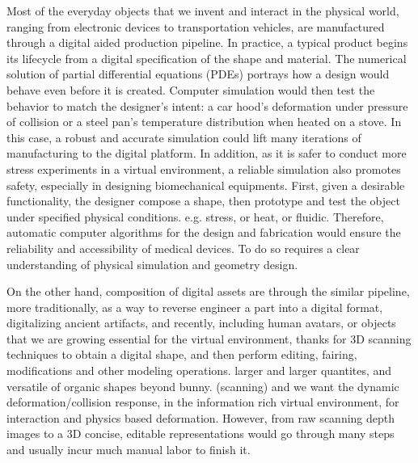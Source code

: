 % 

Most of the everyday objects that we invent and interact in the physical world, ranging from electronic devices to transportation vehicles, are manufactured through a digital aided production pipeline.
In practice, a typical product begins its lifecycle from a digital specification of the shape and material.
The numerical solution of partial differential equations (PDEs) portrays how a design would behave even before it is created. 
Computer simulation would then test the behavior to match the designer's intent: a car hood's deformation under pressure of collision or a steel pan's temperature distribution when heated on a stove. In this case, a robust and accurate simulation could lift many iterations of manufacturing to the digital platform. In addition, as it is safer to conduct more stress experiments in a virtual environment, a reliable simulation also promotes safety, especially in designing biomechanical equipments. 
First, given a desirable functionality, the designer compose a shape, then prototype and test the object under specified physical conditions. e.g. stress, or heat, or fluidic. 
Therefore, automatic computer algorithms for the design and fabrication would ensure the reliability and accessibility of medical devices. To do so requires a clear understanding of physical simulation and geometry design.

On the other hand, composition of digital assets are through the similar pipeline, more traditionally, as a way to reverse engineer a part into a digital format, digitalizing ancient artifacts, and recently, including human avatars, or objects that we are growing essential for the virtual environment, thanks for 3D scanning techniques to obtain a digital shape, and then perform editing, fairing, modifications and other modeling operations. larger and larger quantites, and versatile of organic shapes beyond bunny. (scanning) and we want the dynamic deformation/collision response, in the information rich virtual environment, for interaction and physics based deformation. 
However, from raw scanning depth images to a 3D concise, editable representations would go through many steps and usually incur much manual labor to finish it.

